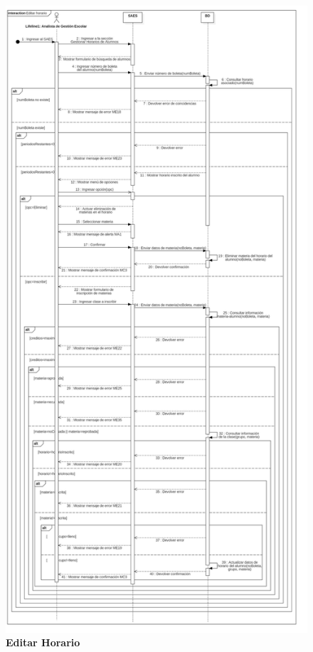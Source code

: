 \begin{figure}[H]
  \centering
    \includegraphics[scale=0.2]{project/Secuencia/Editar_horario.jpg}
  \caption{\textbf{Editar Horario}}
\end{figure}
